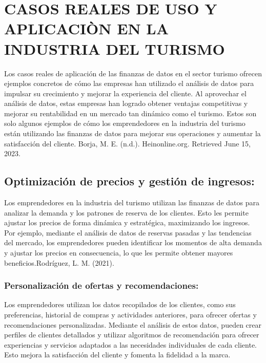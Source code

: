 \documentclass[
  letterpaper,
  DIV=11,
  numbers=noendperiod]{scrreprt}
\begin{document}
\hypertarget{casos-reales-de-uso-y-aplicaciuxf2n-en-la-industria-del-turismo}{%
\section{CASOS REALES DE USO Y APLICACIÒN EN LA INDUSTRIA DEL
TURISMO}\label{casos-reales-de-uso-y-aplicaciuxf2n-en-la-industria-del-turismo}}

Los casos reales de aplicación de las finanzas de datos en el sector
turismo ofrecen ejemplos concretos de cómo las empresas han utilizado el
análisis de datos para impulsar su crecimiento y mejorar la experiencia
del cliente. Al aprovechar el análisis de datos, estas empresas han
logrado obtener ventajas competitivas y mejorar su rentabilidad en un
mercado tan dinámico como el turismo. Estos son solo algunos ejemplos de
cómo los emprendedores en la industria del turismo están utilizando las
finanzas de datos para mejorar sus operaciones y aumentar la
satisfacción del cliente. Borja, M. E. (n.d.). Heinonline.org. Retrieved
June 15, 2023.

\hypertarget{optimizaciuxf3n-de-precios-y-gestiuxf3n-de-ingresos}{%
\subsection{Optimización de precios y gestión de
ingresos:}\label{optimizaciuxf3n-de-precios-y-gestiuxf3n-de-ingresos}}

Los emprendedores en la industria del turismo utilizan las finanzas de
datos para analizar la demanda y los patrones de reserva de los
clientes. Esto les permite ajustar los precios de forma dinámica y
estratégica, maximizando los ingresos. Por ejemplo, mediante el análisis
de datos de reservas pasadas y las tendencias del mercado, los
emprendedores pueden identificar los momentos de alta demanda y ajustar
los precios en consecuencia, lo que les permite obtener mayores
beneficios.Rodríguez, L. M. (2021).

\hypertarget{personalizaciuxf3n-de-ofertas-y-recomendaciones}{%
\subsubsection{Personalización de ofertas y
recomendaciones:}\label{personalizaciuxf3n-de-ofertas-y-recomendaciones}}

Los emprendedores utilizan los datos recopilados de los clientes, como
sus preferencias, historial de compras y actividades anteriores, para
ofrecer ofertas y recomendaciones personalizadas. Mediante el análisis
de estos datos, pueden crear perfiles de clientes detallados y utilizar
algoritmos de recomendación para ofrecer experiencias y servicios
adaptados a las necesidades individuales de cada cliente. Esto mejora la
satisfacción del cliente y fomenta la fidelidad a la marca.
\end{document}
